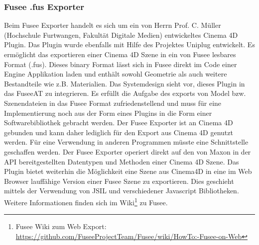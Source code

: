 \documentclass[pagesize, paper=a4, fontsize=12pt, titlepage=true, headings=small, headnosepline, abstractoff, liststotoc, nochapterprefix, plainheadsepline, twoside]{scrreprt}
\begin{document}
\subsubsection{Fusee .fus Exporter}
Beim Fusee Exporter handelt es sich um ein von Herrn Prof. C. Müller (Hochschule Furtwangen, Fakultät Digitale Medien) entwickeltes Cinema 4D Plugin. Das Plugin wurde ebenfalls mit Hilfe des Projektes Uniplug entwickelt. Es ermöglicht das exportieren einer Cinema 4D Szene in ein von Fusee lesbares Format (.fus). Dieses binary Format lässt sich in Fusee direkt im Code einer Engine Applikation laden und enthält sowohl Geometrie als auch weitere Bestandteile wie z.B. Materialien. Das Systemdesign sieht vor, dieses Plugin in das FuseeAT zu integrieren. Es erfüllt die Aufgabe des exports von Model bzw. Szenendateien in das Fusee Format zufriedenstellend und muss für eine Implementierung noch aus der Form eines Plugins in die Form einer Softwarebibliothek gebracht werden. Der Fusee Exporter ist an Cinema 4D gebunden und kann daher lediglich für den Export aus Cinema 4D genutzt werden. Für eine Verwendung in anderen Programmen müsste eine Schnittstelle geschaffen werden. Der Fusee Exporter operiert direkt auf den von Maxon in der API bereitgestellten Datentypen und Methoden einer Cinema 4D Szene.
Das Plugin bietet weiterhin die Möglichkeit eine Szene aus Cinema4D in eine im Web Browser lauffähige Version einer Fusee Szene zu exportieren. Dies geschieht mittels der Verwendung von JSIL und verschiedener Javascript Bibliotheken. Weitere Informationen finden sich im Wiki\footnote{Fusee Wiki zum Web Export: \url{https://github.com/FuseeProjectTeam/Fusee/wiki/HowTo:-Fusee-on-Web}} zu Fusee.
\end{document}
